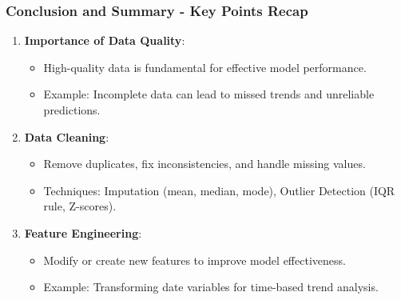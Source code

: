 \documentclass[aspectratio=169]{beamer}
\begin{document}
\begin{frame}[fragile]
    \frametitle{Conclusion and Summary - Key Points Recap}
    \begin{enumerate}
        \item \textbf{Importance of Data Quality}:
        \begin{itemize}
            \item High-quality data is fundamental for effective model performance.
            \item Example: Incomplete data can lead to missed trends and unreliable predictions.
        \end{itemize}
        
        \item \textbf{Data Cleaning}:
        \begin{itemize}
            \item Remove duplicates, fix inconsistencies, and handle missing values.
            \item Techniques: Imputation (mean, median, mode), Outlier Detection (IQR rule, Z-scores).
        \end{itemize}
        
        \item \textbf{Feature Engineering}:
        \begin{itemize}
            \item Modify or create new features to improve model effectiveness.
            \item Example: Transforming date variables for time-based trend analysis.
        \end{itemize}
    \end{enumerate}
\end{frame}
\end{document}
